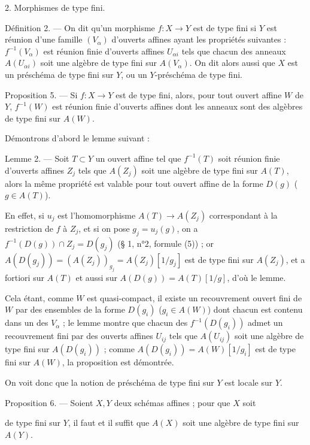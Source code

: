 \newpage


2. Morphismes de type fini.

Définition 2. — On dit qu'un morphisme $f : X \to Y$ est de type fini si $Y$ est réunion d'une famille $(V_\alpha)$ d'ouverts affines ayant les propriétés suivantes : $f^{-1}(V_\alpha)$ est réunion finie d'ouverts affines $U_{\alpha i}$ tels que chacun des anneaux $A(U_{\alpha i})$ soit une algèbre de type fini sur $A(V_\alpha)$. On dit alors aussi que $X$ est un préschéma de type fini sur $Y$, ou un $Y$-préschéma de type fini.

Proposition 5. — Si $f : X \to Y$ est de type fini, alors, pour tout ouvert affine $W$ de $Y$, $f^{-1}(W)$ est réunion finie d'ouverts affines dont les anneaux sont des algèbres de type fini sur $A(W)$.

Démontrons d'abord le lemme suivant :

Lemme 2. — Soit $T \subset Y$ un ouvert affine tel que $f^{-1}(T)$ soit réunion finie d'ouverts affines $Z_j$ tels que $A(Z_j)$ soit une algèbre de type fini sur $A(T)$, alors la même propriété est valable pour tout ouvert affine de la forme $D(g)$ ($g \in A(T)$).

En effet, si $u_j$ est l'homomorphisme $A(T) \to A(Z_j)$ correspondant à la restriction de $f$ à $Z_j$, et si on pose $g_j = u_j(g)$, on a $f^{-1}(D(g)) \cap Z_j = D(g_j)$ (§ 1, n°2, formule (5)) ; or $A(D(g_j)) = (A(Z_j))_{g_j} = A(Z_j)[1/g_j]$ est de type fini sur $A(Z_j)$, et a fortiori sur $A(T)$ et aussi sur $A(D(g)) = A(T)[1/g]$, d'où le lemme.

Cela étant, comme $W$ est quasi-compact, il existe un recouvrement ouvert fini de $W$ par des ensembles de la forme $D(g_i)$ ($g_i \in A(W)$) dont chacun est contenu dans un des $V_\alpha$ ; le lemme montre que chacun des $f^{-1}(D(g_i))$ admet un recouvrement fini par des ouverts affines $U_{ij}$ tels que $A(U_{ij})$ soit une algèbre de type fini sur $A(D(g_i))$ ; comme $A(D(g_i)) = A(W)[1/g_i]$ est de type fini sur $A(W)$, la proposition est démontrée.

On voit donc que la notion de préschéma de type fini sur $Y$ est locale sur $Y$.

Proposition 6. — Soient $X, Y$ deux schémas affines ; pour que $X$ soit

\newpage


de type fini sur $Y$, il faut et il suffit que $A(X)$ soit une algèbre de type fini sur $A(Y)$.

